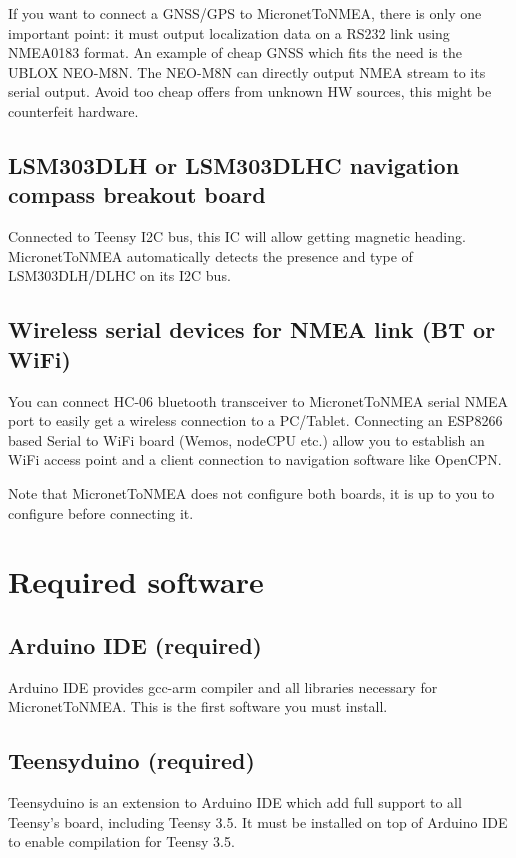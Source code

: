 \documentclass{report}
\begin{document}
If you want to connect a GNSS/GPS to MicronetToNMEA, there is only one important point: it must output localization data on a RS232 link using NMEA0183 format. An example of cheap GNSS which fits the need is the UBLOX NEO-M8N. The NEO-M8N can directly output NMEA stream to its serial output. Avoid too cheap offers from unknown HW sources, this might be counterfeit hardware.

\subsection{LSM303DLH or LSM303DLHC navigation compass breakout board}

Connected to Teensy I2C bus, this IC will allow getting magnetic heading. MicronetToNMEA automatically detects the presence and type of LSM303DLH/DLHC on its I2C bus.

\subsection{Wireless serial devices for NMEA link (BT or WiFi)}

You can connect HC-06 bluetooth transceiver to MicronetToNMEA serial NMEA port to easily get a wireless connection to a PC/Tablet. Connecting an ESP8266 based Serial to WiFi board (Wemos, nodeCPU etc.) allow you to establish an WiFi access point and a client connection to navigation software like OpenCPN.

Note that MicronetToNMEA does not configure both boards, it is up to you to configure before connecting it.

\section{Required software}

\subsection{Arduino IDE (required)}
Arduino IDE provides gcc-arm compiler and all libraries necessary for MicronetToNMEA. This is the first software you must install.

\subsection{Teensyduino (required)}

Teensyduino is an extension to Arduino IDE which add full support to all Teensy’s board, including Teensy 3.5. It must be installed on top of Arduino IDE to enable compilation for Teensy 3.5.
\end{document}
